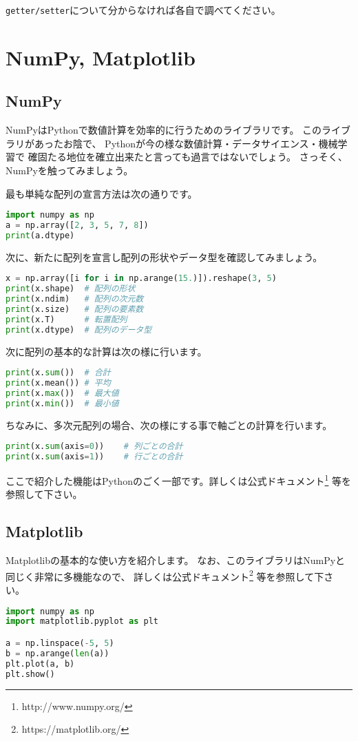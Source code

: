 			\texttt{getter/setter}について分からなければ各自で調べてください。

	\section{NumPy, Matplotlib}
		\subsection{NumPy}
			NumPyはPythonで数値計算を効率的に行うためのライブラリです。
			このライブラリがあったお陰で、
			Pythonが今の様な数値計算・データサイエンス・機械学習で
			確固たる地位を確立出来たと言っても過言ではないでしょう。
			さっそく、NumPyを触ってみましょう。
			
			最も単純な配列の宣言方法は次の通りです。
			
\begin{lstlisting}[language=python, basicstyle=\ttfamily, tabsize=4, frame=single]
import numpy as np
a = np.array([2, 3, 5, 7, 8])
print(a.dtype)
\end{lstlisting}

			次に、新たに配列を宣言し配列の形状やデータ型を確認してみましょう。

\begin{lstlisting}[language=python, basicstyle=\ttfamily, tabsize=4, frame=single]
x = np.array([i for i in np.arange(15.)]).reshape(3, 5)
print(x.shape)	# 配列の形状
print(x.ndim)	# 配列の次元数
print(x.size)	# 配列の要素数
print(x.T)		# 転置配列
print(x.dtype)	# 配列のデータ型
\end{lstlisting}
			
			\newpage
			次に配列の基本的な計算は次の様に行います。
\begin{lstlisting}[language=python, basicstyle=\ttfamily, tabsize=4, frame=single]
print(x.sum())	# 合計
print(x.mean())	# 平均
print(x.max())	# 最大値
print(x.min())	# 最小値
\end{lstlisting}

			ちなみに、多次元配列の場合、次の様にする事で軸ごとの計算を行います。
			
\begin{lstlisting}[language=python, basicstyle=\ttfamily, tabsize=4, frame=single]
print(x.sum(axis=0))	# 列ごとの合計
print(x.sum(axis=1))	# 行ごとの合計
\end{lstlisting}
		
			ここで紹介した機能はPythonのごく一部です。詳しくは公式ドキュメント\footnote{http://www.numpy.org/} 等を参照して下さい。
		
		\subsection{Matplotlib}
			Matplotlibの基本的な使い方を紹介します。
			なお、このライブラリはNumPyと同じく非常に多機能なので、
			詳しくは公式ドキュメント\footnote{https://matplotlib.org/} 等を参照して下さい。
			
\begin{lstlisting}[language=python, basicstyle=\ttfamily, frame=single,tabsize=4]
import numpy as np
import matplotlib.pyplot as plt

a = np.linspace(-5, 5)
b = np.arange(len(a))
plt.plot(a, b)
plt.show()
\end{lstlisting}
			